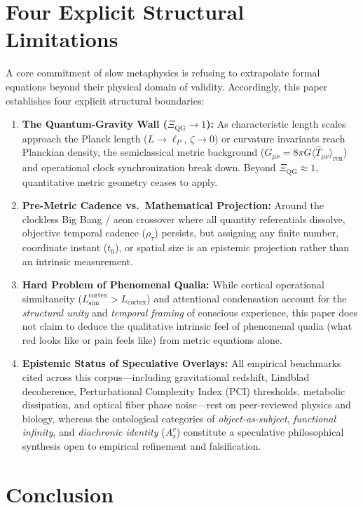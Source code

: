 \documentclass[11pt,a4paper]{article}
\begin{document}
\section{Four Explicit Structural Limitations}

A core commitment of slow metaphysics is refusing to extrapolate formal equations beyond their physical domain of validity. Accordingly, this paper establishes four explicit structural boundaries:

\begin{enumerate}
    \item \textbf{The Quantum-Gravity Wall ($\Xi_{\mathrm{QG}} \to 1$):} As characteristic length scales approach the Planck length ($L \to \ell_P$, $\zeta \to 0$) or curvature invariants reach Planckian density, the semiclassical metric background ($G_{\mu\nu} = 8\pi G \langle \hat{T}_{\mu\nu} \rangle_{\mathrm{ren}}$) and operational clock synchronization break down. Beyond $\Xi_{\mathrm{QG}} \approx 1$, quantitative metric geometry ceases to apply.
    \item \textbf{Pre-Metric Cadence vs.\ Mathematical Projection:} Around the clockless Big Bang / aeon crossover where all quantity referentials dissolve, objective temporal cadence ($\rho_\tau$) persists, but assigning any finite number, coordinate instant ($t_0$), or spatial size is an epistemic projection rather than an intrinsic measurement.
    \item \textbf{Hard Problem of Phenomenal Qualia:} While cortical operational simultaneity ($L_{\mathrm{sim}}^{\mathrm{cortex}} > L_{\mathrm{cortex}}$) and attentional condensation account for the \emph{structural unity} and \emph{temporal framing} of conscious experience, this paper does not claim to deduce the qualitative intrinsic feel of phenomenal qualia (what red looks like or pain feels like) from metric equations alone.
    \item \textbf{Epistemic Status of Speculative Overlays:} All empirical benchmarks cited across this corpus---including gravitational redshift, Lindblad decoherence, Perturbational Complexity Index (PCI) thresholds, metabolic dissipation, and optical fiber phase noise---rest on peer-reviewed physics and biology, whereas the ontological categories of \emph{object-as-subject}, \emph{functional infinity}, and \emph{diachronic identity} ($A_s^v$) constitute a speculative philosophical synthesis open to empirical refinement and falsification.
\end{enumerate}

\section{Conclusion}
\end{document}
